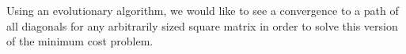 
Using an evolutionary algorithm, we would like to see a convergence to a path of all diagonals for any arbitrarily sized square matrix in order to solve this version of the minimum cost problem.
